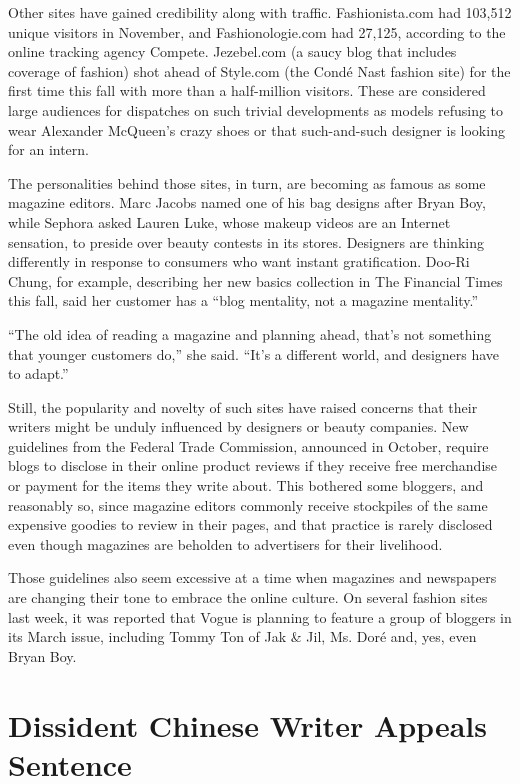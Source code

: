 ﻿\documentclass[12pt]{article}
\begin{document}
Other sites have gained credibility along with traffic. Fashionista.com had 103,512 unique visitors
in November, and Fashionologie.com had 27,125, according to the online tracking agency Compete.
Jezebel.com (a saucy blog that includes coverage of fashion) shot ahead of Style.com (the Cond\'e
Nast fashion site) for the first time this fall with more than a half-million visitors. These are
considered large audiences for dispatches on such trivial developments as models refusing to wear
Alexander McQueen's crazy shoes or that such-and-such designer is looking for an intern.

The personalities behind those sites, in turn, are becoming as famous as some magazine editors. Marc
Jacobs named one of his bag designs after Bryan Boy, while Sephora asked Lauren Luke, whose makeup
videos are an Internet sensation, to preside over beauty contests in its stores. Designers are
thinking differently in response to consumers who want instant gratification. Doo-Ri Chung, for
example, describing her new basics collection in The Financial Times this fall, said her customer
has a ``blog mentality, not a magazine mentality.''

``The old idea of reading a magazine and planning ahead, that's not something that younger customers
do,'' she said. ``It's a different world, and designers have to adapt.''

Still, the popularity and novelty of such sites have raised concerns that their writers might be
unduly influenced by designers or beauty companies. New guidelines from the Federal Trade
Commission, announced in October, require blogs to disclose in their online product reviews if they
receive free merchandise or payment for the items they write about. This bothered some bloggers, and
reasonably so, since magazine editors commonly receive stockpiles of the same expensive goodies to
review in their pages, and that practice is rarely disclosed even though magazines are beholden to
advertisers for their livelihood.

Those guidelines also seem excessive at a time when magazines and newspapers are changing their tone
to embrace the online culture. On several fashion sites last week, it was reported that Vogue is
planning to feature a group of bloggers in its March issue, including Tommy Ton of Jak \& Jil, Ms.
Dor\'e and, yes, even Bryan Boy.

\section{Dissident Chinese Writer Appeals Sentence}
\end{document}

